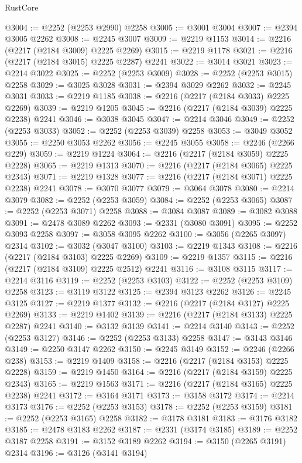 \begin{lexlean}{RustCore}
\begin{coremodule}
@3004 := @2252 (@2253 @2990) @2258
@3005 := @3001 @3004
@3007 := @2394 @3005 @2262
@3008 := @2245 @3007
@3009 := @2219 @1153
@3014 := @2216 (@2217 (@2184 @3009) @2225 @2269)
@3015 := @2219 @1178
@3021 := @2216 (@2217 (@2184 @3015) @2225 @2287) @2241
@3022 := @3014 @3021
@3023 := @2214 @3022
@3025 := @2252 (@2253 @3009)
@3028 := @2252 (@2253 @3015) @2258
@3029 := @3025 @3028
@3031 := @2394 @3029 @2262
@3032 := @2245 @3031
@3033 := @2219 @1185
@3038 := @2216 (@2217 (@2184 @3033) @2225 @2269)
@3039 := @2219 @1205
@3045 := @2216 (@2217 (@2184 @3039) @2225 @2238) @2241
@3046 := @3038 @3045
@3047 := @2214 @3046
@3049 := @2252 (@2253 @3033)
@3052 := @2252 (@2253 @3039) @2258
@3053 := @3049 @3052
@3055 := @2250 @3053 @2262
@3056 := @2245 @3055
@3058 := @2246 (@2266 @229)
@3059 := @2219 @1224
@3064 := @2216 (@2217 (@2184 @3059) @2225 @2228)
@3065 := @2219 @1313
@3070 := @2216 (@2217 (@2184 @3065) @2225 @2343)
@3071 := @2219 @1328
@3077 := @2216 (@2217 (@2184 @3071) @2225 @2238) @2241
@3078 := @3070 @3077
@3079 := @3064 @3078
@3080 := @2214 @3079
@3082 := @2252 (@2253 @3059)
@3084 := @2252 (@2253 @3065)
@3087 := @2252 (@2253 @3071) @2258
@3088 := @3084 @3087
@3089 := @3082 @3088
@3091 := @2478 @3089 @2262
@3093 := @2331 (@3080 @3091)
@3095 := @2252 @3093 @2258
@3097 := @3058 @3095 @2262
@3100 := @3056 (@2265 @3097) @2314
@3102 := @3032 (@3047 @3100)
@3103 := @2219 @1343
@3108 := @2216 (@2217 (@2184 @3103) @2225 @2269)
@3109 := @2219 @1357
@3115 := @2216 (@2217 (@2184 @3109) @2225 @2512) @2241
@3116 := @3108 @3115
@3117 := @2214 @3116
@3119 := @2252 (@2253 @3103)
@3122 := @2252 (@2253 @3109) @2258
@3123 := @3119 @3122
@3125 := @2394 @3123 @2262
@3126 := @2245 @3125
@3127 := @2219 @1377
@3132 := @2216 (@2217 (@2184 @3127) @2225 @2269)
@3133 := @2219 @1402
@3139 := @2216 (@2217 (@2184 @3133) @2225 @2287) @2241
@3140 := @3132 @3139
@3141 := @2214 @3140
@3143 := @2252 (@2253 @3127)
@3146 := @2252 (@2253 @3133) @2258
@3147 := @3143 @3146
@3149 := @2250 @3147 @2262
@3150 := @2245 @3149
@3152 := @2246 (@2266 @238)
@3153 := @2219 @1409
@3158 := @2216 (@2217 (@2184 @3153) @2225 @2228)
@3159 := @2219 @1450
@3164 := @2216 (@2217 (@2184 @3159) @2225 @2343)
@3165 := @2219 @1563
@3171 := @2216 (@2217 (@2184 @3165) @2225 @2238) @2241
@3172 := @3164 @3171
@3173 := @3158 @3172
@3174 := @2214 @3173
@3176 := @2252 (@2253 @3153)
@3178 := @2252 (@2253 @3159)
@3181 := @2252 (@2253 @3165) @2258
@3182 := @3178 @3181
@3183 := @3176 @3182
@3185 := @2478 @3183 @2262
@3187 := @2331 (@3174 @3185)
@3189 := @2252 @3187 @2258
@3191 := @3152 @3189 @2262
@3194 := @3150 (@2265 @3191) @2314
@3196 := @3126 (@3141 @3194)

\end{coremodule}
\end{lexlean}
